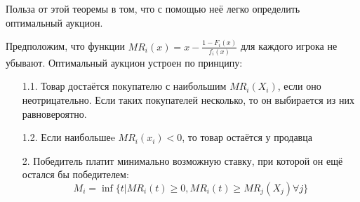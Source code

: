 Польза от этой теоремы в том, что с помощью неё легко определить оптимальный аукцион.


\begin{myth}
\label{th:optimal_structure}
Предположим, что функции $ MR_{i}(x)=x-\frac{1-F_{i}(x)}{f_{i}(x)} $ для каждого игрока не убывают. Оптимальный аукцион устроен по принципу:
\begin{itemize}
\item[1.1.] Товар достаётся покупателю с наибольшим $ MR_{i}(X_{i}) $, если оно неотрицательно. Если таких покупателей несколько, то он выбирается из них равновероятно.
\item[1.2.] Если наибольшеe $ MR_{i}(x_{i})<0 $, то товар остаётся у продавца
\item[2.] Победитель платит минимально возможную ставку, при которой он ещё остался бы победителем:
\begin{equation}
M_{i}=\inf\{ t| MR_{i}(t)\geq 0 , MR_{i}(t)\geq MR_{j}(X_{j}) \forall j \}
\end{equation}
\end{itemize}
\end{myth}

